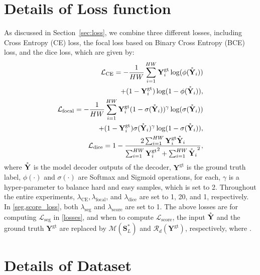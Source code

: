 \documentclass[nohyperref]{article}
\newcommand{\bs}{\boldsymbol}
\newcommand{\asty}{\accentset{\ast}{\mathbf{Y}}}
\newcommand{\gty}{\mbf{Y}^{\text{gt}}}
\newcommand{\mbf}{\mathbf}
\theoremstyle{plain}
\theoremstyle{definition}
\theoremstyle{remark}
\begin{document}
\section{Details of Loss function}
\label{appendix:loss}
As discussed in Section~\ref{sec:loss}, we combine three different losses, including Cross Entropy (CE) loss, the focal loss based on Binary Cross Entropy (BCE) loss, and the dice loss, which are given  by:
\begin{align}
\begin{split}
\mathcal{L}_{\text{CE}} = -\frac{1}{HW} \sum^{HW}_{i=1} \gty_i \log(\phi(\asty_i)) \\
    + (1- \gty_i)\log(1-\phi(\asty_i)), \\   
\end{split}\\
\begin{split}
\mathcal{L}_{\text{focal}} = -\frac{1}{HW} \sum^{HW}_{i=1}\gty_i (1- \sigma(\asty_i))^{\gamma} \log(\sigma(\asty_i) )\\
    + (1- \gty_i)\sigma(\asty_i)^{\gamma}\log(1-\sigma(\asty_i)), \\   
\end{split}\\    
\begin{split}
\mathcal{L}_{\text{dice}} = 1 -\frac{2\sum^{HW}_{i=1}\gty_i \asty_i}{\sum^{HW}_{i=1} {\gty_i}^2 + \sum^{HW}_{i=1} {\asty_i}^2}, 
\end{split} \\
\end{align}
where $\asty$ is the model decoder outputs of the decoder, $\gty$ is the ground truth label, $\phi(\cdot)$ and $\sigma(\cdot)$ are Softmax and Sigmoid operations, for each, $\gamma$ is a hyper-parameter to balance hard and easy samples, which is set to 2.
Throughout the entire experiments,
$\lambda_{\text{CE}}, \lambda_{\text{focal}}$, and $\lambda_{\text{dice}}$ are set to 1, 20, and 1, respectively. In \eqref{seg,score_loss}, both $\lambda_{\text{seg}}$ and  $\lambda_{\text{score}}$ are set to 1. 
The above losses are for computing $\mathcal{L}_{\text{seg}}$ in \eqref{losses}, and when to compute $\mathcal{L}_{\text{score}}$, the input $\asty$ and the ground truth $\gty$ are replaced by $\mathcal{M}(\bs{S}^{\ast}_L)$ and $\mathcal{R}_{d}(\gty)$, respectively, where .



\section{Details of Dataset}
\label{appen_datsset}
\end{document}
